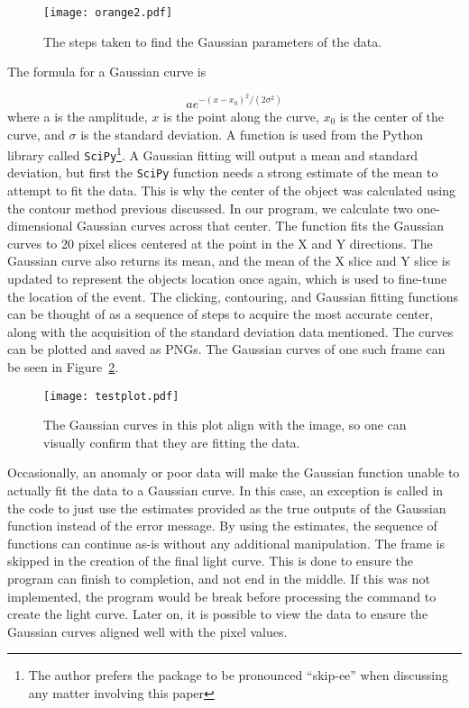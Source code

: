 \begin{figure}[h!]
	\centering
	\texttt{[image: orange2.pdf]}
	\caption{The steps taken to find the Gaussian parameters of the data.}
	\label{fig:gaussianfinder}
\end{figure}

The formula for a Gaussian curve is 

\begin{equation}
	ae^{-(x-x_0)^2/(2\sigma^2)}
\end{equation}
where a is the amplitude, $x$ is the point along the curve, $x_0$ is the center of the curve, and $\sigma$ is the standard deviation. A function is used from the Python library called \texttt{SciPy}\footnote{The author prefers the package to be pronounced ``skip-ee'' when discussing any matter involving this paper}. A Gaussian fitting will output a mean and standard deviation, but first the \texttt{SciPy} function needs a strong estimate of the mean to attempt to fit the data. This is why the center of the object was calculated using the contour method previous discussed. In our program, we calculate two one-dimensional Gaussian curves across that center. The function fits the Gaussian curves to 20 pixel slices centered at the point in the X and Y directions. The Gaussian curve also returns its mean, and the mean of the X slice and Y slice is updated to represent the objects location once again, which is used to fine-tune the location of the event. The clicking, contouring, and Gaussian fitting functions can be thought of as a sequence of steps to acquire the most accurate center, along with the acquisition of the standard deviation data mentioned. The curves can be plotted and saved as PNGs. The Gaussian curves of one such frame can be seen in Figure~\ref{fig:testplot}.

\begin{figure}[h!]
	\centering
	\texttt{[image: testplot.pdf]}
	\caption{The Gaussian curves in this plot align with the image, so one can visually confirm that they are fitting the data.}
	\label{fig:testplot}
\end{figure}

Occasionally, an anomaly or poor data will make the Gaussian function unable to actually fit the data to a Gaussian curve. In this case, an exception is called in the code to just use the estimates provided as the true outputs of the Gaussian function instead of the error message. By using the estimates, the sequence of functions can continue as-is without any additional manipulation. The frame is skipped in the creation of the final light curve. This is done to ensure the program can finish to completion, and not end in the middle. If this was not implemented, the program would be break before processing the command to create the light curve. Later on, it is possible to view the data to ensure the Gaussian curves aligned well with the pixel values.

